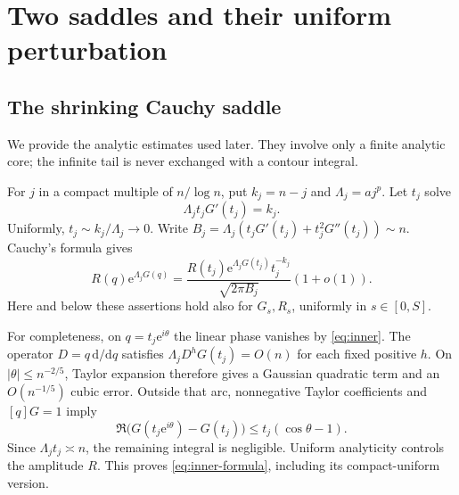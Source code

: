 \documentclass[11pt,a4paper]{article}
\numberwithin{equation}{section}
\theoremstyle{definition}
\theoremstyle{remark}
\newcommand{\ee}{\mathrm e}\newcommand{\dd}{\mathrm d}
\begin{document}
\section{Two saddles and their uniform perturbation}
\label{sec:saddles}
\subsection{The shrinking Cauchy saddle}
We provide the analytic estimates used later. They involve only a finite
analytic core; the infinite tail is never exchanged with a contour integral.

For $j$ in a compact multiple of $n/\log n$, put $k_j=n-j$ and
$\Lambda_j=a j^p$. Let $t_j$ solve
\begin{equation}
 \Lambda_jt_jG'(t_j)=k_j.
 \label{eq:inner}
\end{equation}
Uniformly, $t_j\sim k_j/\Lambda_j\to0$. Write
$B_j=\Lambda_j(t_jG'(t_j)+t_j^2G''(t_j))\sim n$.
Cauchy's formula gives
\begin{equation}
 [q^{k_j}]R(q)\ee^{\Lambda_jG(q)}
 =\frac{R(t_j)\ee^{\Lambda_jG(t_j)}t_j^{-k_j}}
        {\sqrt{2\pi B_j}}(1+o(1)).
 \label{eq:inner-formula}
\end{equation}
Here and below these assertions hold also for $G_s,R_s$, uniformly in
$s\in[0,S]$.

For completeness, on $q=t_j\ee^{i\theta}$ the linear phase vanishes by
\eqref{eq:inner}. The operator $D=q\,\dd/\dd q$ satisfies
$\Lambda_jD^hG(t_j)=O(n)$ for each fixed positive $h$. On
$|\theta|\le n^{-2/5}$, Taylor expansion therefore gives a Gaussian
quadratic term and an $O(n^{-1/5})$ cubic error. Outside that arc,
nonnegative Taylor coefficients and $[q]G=1$ imply
\[
 \Re\bigl(G(t_j\ee^{i\theta})-G(t_j)\bigr)
 \le t_j(\cos\theta-1).
\]
Since $\Lambda_jt_j\asymp n$, the remaining integral is negligible.
Uniform analyticity controls the amplitude $R$. This proves
\eqref{eq:inner-formula}, including its compact-uniform version.
\end{document}

